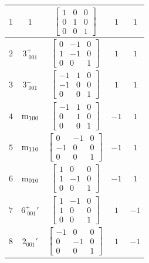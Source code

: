 \documentclass[fleqn,8pt]{jsarticle}
\begin{document}
\begin{longtable}{ccccc}
$ 1 $ & $ 1 $ & $ \begin{bmatrix} 1 & 0 & 0 \\ 0 & 1 & 0 \\ 0 & 0 & 1 \end{bmatrix} $ & $ 1 $ & $ 1 $ \\ \hline
$ 2 $ & $ 3^{+}_{\,\,001} $ & $ \begin{bmatrix} 0 & -1 & 0 \\ 1 & -1 & 0 \\ 0 & 0 & 1 \end{bmatrix} $ & $ 1 $ & $ 1 $ \\ \hline
$ 3 $ & $ 3^{-}_{\,\,001} $ & $ \begin{bmatrix} -1 & 1 & 0 \\ -1 & 0 & 0 \\ 0 & 0 & 1 \end{bmatrix} $ & $ 1 $ & $ 1 $ \\ \hline
$ 4 $ & $ {\rm m}_{100} $ & $ \begin{bmatrix} -1 & 1 & 0 \\ 0 & 1 & 0 \\ 0 & 0 & 1 \end{bmatrix} $ & $ -1 $ & $ 1 $ \\ \hline
$ 5 $ & $ {\rm m}_{110} $ & $ \begin{bmatrix} 0 & -1 & 0 \\ -1 & 0 & 0 \\ 0 & 0 & 1 \end{bmatrix} $ & $ -1 $ & $ 1 $ \\ \hline
$ 6 $ & $ {\rm m}_{010} $ & $ \begin{bmatrix} 1 & 0 & 0 \\ 1 & -1 & 0 \\ 0 & 0 & 1 \end{bmatrix} $ & $ -1 $ & $ 1 $ \\ \hline
$ 7 $ & $ 6^{+}_{\,\,001}{}' $ & $ \begin{bmatrix} 1 & -1 & 0 \\ 1 & 0 & 0 \\ 0 & 0 & 1 \end{bmatrix} $ & $ 1 $ & $ -1 $ \\ \hline
$ 8 $ & $ 2{}_{001}{}' $ & $ \begin{bmatrix} -1 & 0 & 0 \\ 0 & -1 & 0 \\ 0 & 0 & 1 \end{bmatrix} $ & $ 1 $ & $ -1 $ \\ \hline

\end{longtable}
\end{document}
